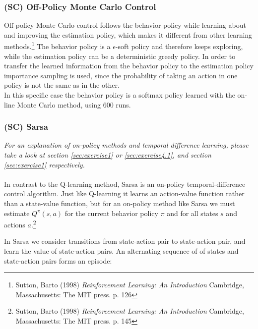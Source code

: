 \documentclass{article}
\begin{document}

\subsubsection{(SC) Off-Policy Monte Carlo Control}\label{sec:exercise4.2}

Off-policy Monte Carlo control follows the behavior policy while learning about and improving the estimation policy, which makes it different from other learning methods.\footnote{Sutton, Barto (1998) \textit{Reinforcement Learning: An Introduction} Cambridge, Massachusetts: The MIT press. p. 126} The behavior policy is a $\epsilon$-soft policy and therefore keeps exploring, while the estimation policy can be a deterministic greedy policy. In order to transfer the learned information from the behavior policy to the estimation policy importance sampling is used, since the probability of taking an action in one policy is not the same as in the other.\\

In this specific case the behavior policy is a softmax policy learned with the on-line Monte Carlo method, using 600 runs. 


\subsubsection{(SC) Sarsa}\label{sec:exercise4.3}
\textit{For an explanation of on-policy methods and temporal difference learning, please take a look at section \ref{sec:exercise1} or \ref{sec:exercise4.1}, and section \ref{sec:exercise1} respectively.}
\\ \\
In contrast to the Q-learning method, Sarsa is an on-policy temporal-difference control algorithm. Just like Q-learning it learns an action-value function rather than a state-value function, but for an on-policy method like Sarsa we must estimate $Q^\pi (s,a)$ for the current behavior policy $\pi$ and for all states $s$ and actions $a$.\footnote{Sutton, Barto (1998) \textit{Reinforcement Learning: An Introduction} Cambridge, Massachusetts: The MIT press. p. 145}

In Sarsa we consider transitions from state-action pair to state-action pair, and learn the value of state-action pairs. An alternating sequence of of states and state-action pairs forms an episode:
\end{document}
